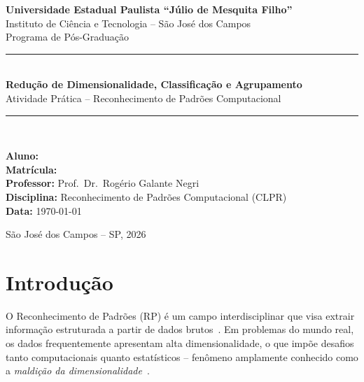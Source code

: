 \documentclass[12pt, a4paper]{article}
\begin{document}
\begin{titlepage}
    \centering
    \vspace*{1.5cm}
    {\large \textbf{Universidade Estadual Paulista ``Júlio de Mesquita Filho''}} \\
    \vspace{0.3cm}
    {\large Instituto de Ciência e Tecnologia -- São José dos Campos} \\
    \vspace{0.3cm}
    {\large Programa de Pós-Graduação} \\[2cm]

    \rule{\textwidth}{1pt} \\[0.5cm]
    {\LARGE \textbf{Redução de Dimensionalidade, Classificação e Agrupamento}} \\[0.3cm]
    {\large Atividade Prática -- Reconhecimento de Padrões Computacional} \\[0.3cm]
    \rule{\textwidth}{1pt} \\[2.5cm]

    \begin{flushleft}
        \textbf{Aluno:} \underline{\hspace{8cm}} \\[0.5cm]
        \textbf{Matrícula:} \underline{\hspace{6cm}} \\[0.5cm]
        \textbf{Professor:} Prof.\ Dr.\ Rogério Galante Negri \\[0.5cm]
        \textbf{Disciplina:} Reconhecimento de Padrões Computacional (CLPR) \\[0.5cm]
        \textbf{Data:} \today
    \end{flushleft}

    \vfill
    {\large São José dos Campos -- SP, 2026}
\end{titlepage}

\tableofcontents
\newpage

\section{Introdução}
\label{sec:intro}

O Reconhecimento de Padrões (RP) é um campo interdisciplinar que visa extrair informação estruturada a partir de dados brutos~\cite{negri2021}. Em problemas do mundo real, os dados frequentemente apresentam alta dimensionalidade, o que impõe desafios tanto computacionais quanto estatísticos -- fenômeno amplamente conhecido como a \emph{maldição da dimensionalidade}~\cite{bishop2006}.
\end{document}
